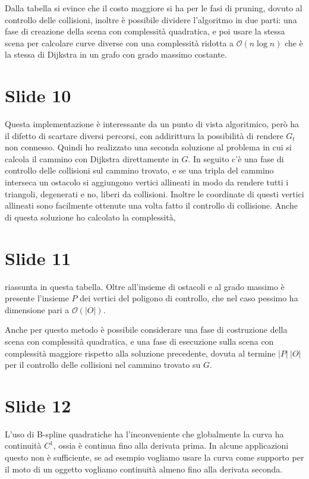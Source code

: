 \documentclass{article}
\newcommand{\bigO}{\ensuremath{\mathcal{O}}}
\begin{document}
Dalla tabella si evince che il costo maggiore si ha per le fasi di
pruning, dovuto al controllo delle collisioni, inoltre è possibile
dividere l'algoritmo in due parti: una fase di creazione della scena
con complessità quadratica, e poi usare la stessa scena per calcolare
curve diverse con una complessità ridotta a $\bigO(n\log n)$ che è la
stessa di Dijkstra in un grafo con grado massimo costante.

\section*{Slide 10}
Questa implementazione è interessante da un punto di vista
algoritmico, però ha il difetto di scartare diversi percorsi, con
addirittura la possibilità di rendere $G_t$ non connesso. Quindi
ho realizzato una seconda soluzione al problema in cui si calcola il
cammino con Dijkstra direttamente in $G$. In seguito c'è una fase di
controllo delle collisioni sul cammino trovato, e se una tripla del
cammino interseca un ostacolo si aggiungono vertici allineati in modo
da rendere tutti i triangoli, degenerati e no, liberi da
collisioni. Inoltre le coordinate di questi vertici allineati sono
facilmente ottenute una volta fatto il controllo di collisione. Anche
di questa soluzione ho calcolato la complessità,

\section*{Slide 11}
riassunta in questa tabella. Oltre all'insieme di ostacoli e al grado
massimo è presente l'insieme $P$ dei vertici del poligono di
controllo, che nel caso pessimo ha dimensione pari a $\bigO(|O|)$.

Anche per questo metodo è possibile considerare una fase di
costruzione della scena con complessità quadratica, e una fase di
esecuzione sulla scena con complessità maggiore rispetto alla
soluzione precedente, dovuta al termine $|P|\ |O|$ per il controllo
delle collisioni nel cammino trovato su $G$.

\section*{Slide 12}
L'uso di B-spline quadratiche ha l'inconveniente che globalmente la
curva ha continuità $C^1$, ossia è continua fino alla derivata
prima. In alcune applicazioni questo non è
sufficiente, se ad esempio vogliamo usare la curva come supporto per il
moto di un oggetto vogliamo continuità almeno fino alla derivata
seconda.
\end{document}

